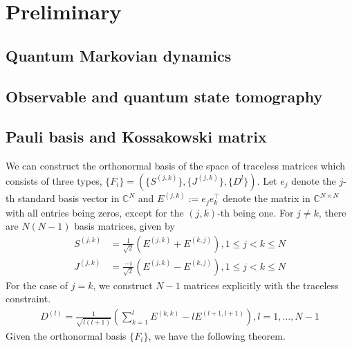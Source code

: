 \documentclass[10pt]{article}  %
\theoremstyle{plain}
\numberwithin{equation}{section}
\newcommand{\rbracket}[1]{\left(#1\right)}      %
\def\C{\mathbb{C}}
\renewcommand{\C}{\mathbb{C}}
\begin{document}
\section{Preliminary}

\subsection{Quantum Markovian dynamics}

\subsection{Observable and quantum state tomography}

\subsection{Pauli basis and Kossakowski matrix}
We can construct the orthonormal basis of the space of traceless matrices which consists of three types, $\{F_i\} = (\{S^{(j, k)}\}, \{J^{(j, k)}\}, \{D^l\})$. Let $e_j$ denote the $j$-th standard basis vector in $\C^N$ and $E^{(j, k)}:= e_j e_k^\top$ denote the matrix in $\C^{N \times N}$ with all entries being zeros, except for the $(j, k)$-th being one. For $j \neq k$, there are $N(N-1)$ basis matrices, given by
\begin{align}
	S^{(j, k)} &= \frac{1}{\sqrt{2}}\rbracket{E^{(j, k)} + E^{(k, j)}}, 1 \leq j < k \leq N\\
	J^{(j, k)} &= \frac{-i}{\sqrt{2}}\rbracket{E^{(j, k)} - E^{(k, j)}}, 1 \leq j < k \leq N
\end{align}
For the case of $j = k$, we construct $N-1$ matrices explicitly with the traceless constraint. 
\begin{align}
	D^{(l)} = \frac{1}{\sqrt{l(l+1)}} \rbracket{\sum_{k = 1}^l E^{(k, k)} - lE^{(l+1, l+1)}}, l = 1, \dots, N-1
\end{align}
Given the orthonormal basis $\{F_i\}$, we have the following theorem. 
\end{document}
